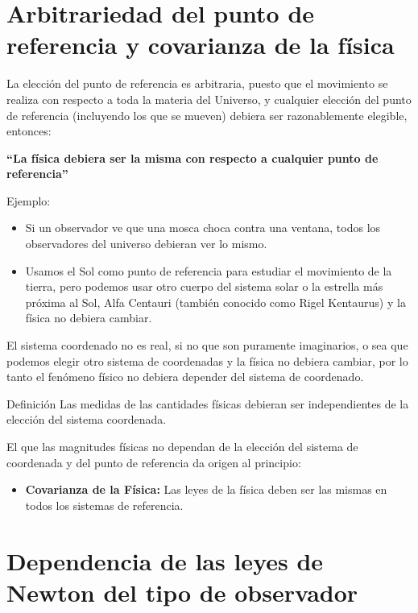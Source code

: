 \documentclass[../apunte_mecanica_clasica.tex]{subfiles}%
\begin{document}
\section{Arbitrariedad del punto de referencia y covarianza de la física}

La elección del punto de referencia es arbitraria, puesto que el movimiento se realiza con respecto a toda la materia del Universo, y cualquier elección del punto de referencia (incluyendo los que se mueven) debiera ser razonablemente elegible, entonces:

\begin{center}
\textbf{“La física debiera ser la misma con respecto a cualquier punto de referencia”}
\end{center}


Ejemplo:
\begin{itemize}
    \item Si un observador ve que una mosca choca contra una ventana, todos los observadores del universo debieran ver lo mismo.
    \item Usamos el Sol como punto de referencia para estudiar el movimiento de la tierra, pero podemos usar otro cuerpo del sistema solar o la estrella más próxima al Sol, Alfa Centauri (también conocido como Rigel Kentaurus) y la física no debiera cambiar.
\end{itemize}

El sistema coordenado no es real, si no que son puramente imaginarios, o sea que podemos elegir otro sistema de coordenadas y la física no debiera cambiar, por lo tanto el fenómeno físico no debiera depender del sistema de coordenado.

\begin{apuntebloque}{Definición}
Las medidas de las cantidades físicas debieran ser independientes de la elección del sistema coordenada.
\end{apuntebloque}

El que las magnitudes físicas no dependan de la elección del sistema de coordenada y del punto de referencia da origen al principio:
\begin{itemize}
    \item \textbf{Covarianza de la Física:} Las leyes de la física deben ser las mismas en todos los sistemas de referencia.
\end{itemize}

\section{Dependencia de las leyes de Newton del tipo de observador}
\end{document}
